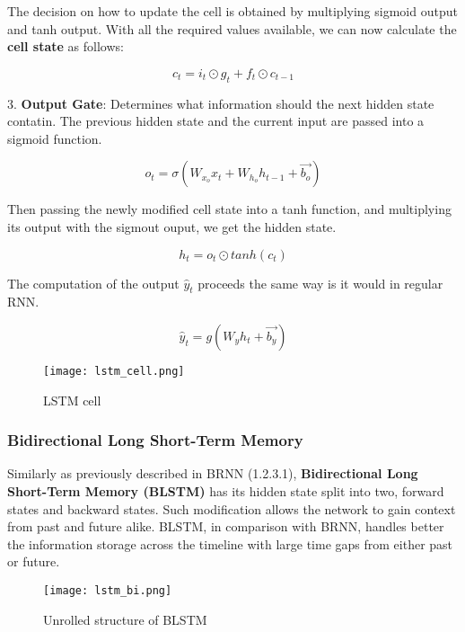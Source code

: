 The decision on how to update the cell is obtained by multiplying sigmoid output and tanh output. With all the required values available, we can now calculate the \textbf{cell state} as follows:

\begin{equation}
    {c_t = i_t \odot g_t + f_t \odot c_{t-1}}
\end{equation}


3. \textbf{Output Gate}: Determines what information should the next hidden state contatin. The previous hidden state and the current input are passed into a sigmoid function.

\begin{equation}
    {o_t = \sigma(W_{x_o}x_t + W_{h_o}h_{t-1}+\vec{b_o})}
\end{equation}

Then passing the newly modified cell state into a tanh function, and multiplying its output with the sigmout ouput, we get the hidden state.\cite{guideLSTM}

\begin{equation}
    {h_t = o_t \odot tanh(c_t)}
\end{equation}


The computation of the output $\hat{y}_t$ proceeds the same way is it would in regular RNN.%

\begin{equation}
    {\hat{y}_t = g(W_{y}h_t + \vec{b_y})}
\end{equation}

\begin{figure}[h]
	\centering
    \texttt{[image: lstm\_cell.png]}
	\caption{LSTM cell \cite{lstmcell_img}}
	\label{fig:lstmCell}
\end{figure}

\subsubsection{Bidirectional Long Short-Term Memory}

Similarly as previously described in BRNN (1.2.3.1), \textbf{Bidirectional Long Short-Term Memory (BLSTM)} has its hidden state split into two, forward states and backward states. Such modification allows the network to gain context from past and future alike. BLSTM, in comparison with BRNN, handles better the information storage across the timeline with large time gaps from either past or future.

\begin{figure}[h]
	\centering
    \texttt{[image: lstm\_bi.png]}
	\caption{Unrolled structure of BLSTM \cite{matous}}
	\label{fig:blstm}
\end{figure}


